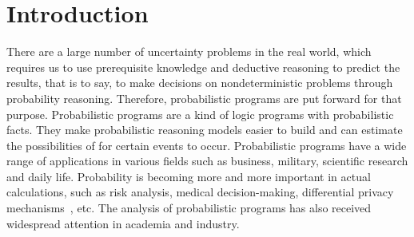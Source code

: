 \documentclass[sigconf,review, anonymous]{acmart}
\newcommand\leaveout[1]{}
\begin{document}
\leaveout{
%
%
\begin{CCSXML}
<ccs2012>
 <concept>
  <concept_id>10010520.10010553.10010562</concept_id>
  <concept_desc>Computer systems organization~Embedded systems</concept_desc>
  <concept_significance>500</concept_significance>
 </concept>
 <concept>
  <concept_id>10010520.10010575.10010755</concept_id>
  <concept_desc>Computer systems organization~Redundancy</concept_desc>
  <concept_significance>300</concept_significance>
 </concept>
 <concept>
  <concept_id>10010520.10010553.10010554</concept_id>
  <concept_desc>Computer systems organization~Robotics</concept_desc>
  <concept_significance>100</concept_significance>
 </concept>
 <concept>
  <concept_id>10003033.10003083.10003095</concept_id>
  <concept_desc>Networks~Network reliability</concept_desc>
  <concept_significance>100</concept_significance>
 </concept>
</ccs2012>  
\end{CCSXML}
}





\maketitle


\section{Introduction}
There are a large number of uncertainty problems in the real world, which requires us to use prerequisite knowledge and deductive reasoning to predict the results, that is to say, to make decisions on nondeterministic problems through probability reasoning. Therefore, probabilistic programs are put forward for that purpose. Probabilistic programs are a kind of logic programs with probabilistic facts. They make probabilistic reasoning models easier to build and can estimate the possibilities of for  certain events to occur.
Probabilistic programs have a wide range of applications in various fields such as business, military, scientific research and daily life. Probability is becoming more and more important in actual calculations, such as risk analysis, medical decision-making, differential privacy mechanisms~\cite{Dwork2014Differential}, etc. The analysis of probabilistic programs has also received widespread attention in academia and industry. %
\end{document}
